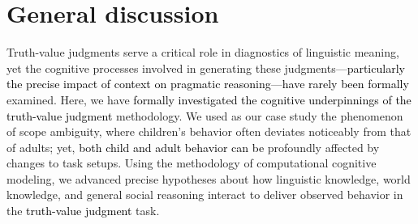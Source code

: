 \documentclass[cm]{glossa}
\newcommand{\lp}[1]{\textcolor{black}{#1}} %
\begin{document}
\section{General discussion} \label{discussion}
Truth-value judgments 
serve a critical role in diagnostics of linguistic meaning, yet the cognitive processes involved in generating these judgments\lp{---particularly the precise impact of context on pragmatic reasoning---}\lp{have rarely been formally} examined. Here, we have 
\lp{formally investigated the cognitive underpinnings of the}
\lp{truth-value judgment}
methodology. We used as our case study the phenomenon of scope ambiguity, where children's behavior often deviates noticeably from that of adults; yet, \lp{both child and adult behavior can be} profoundly affected by changes to task setups.  Using the methodology of computational cognitive modeling, we advanced precise hypotheses about how linguistic knowledge, world knowledge, and general social reasoning interact to deliver observed behavior in the 
\lp{truth-value judgment}
task.
\end{document}
